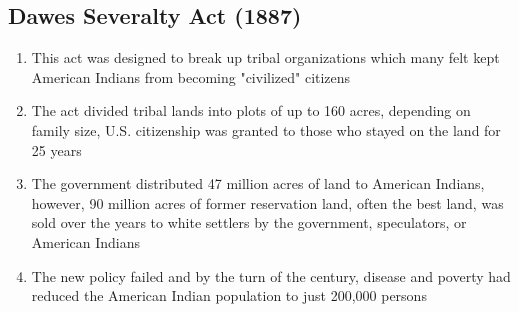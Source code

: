 \documentclass[12pt]{article} %
\begin{document}
\subsection{Dawes Severalty Act (1887)}
\begin{enumerate}
	\item This act was designed to break up tribal organizations which many felt kept American 
		Indians from becoming "civilized" citizens
	\item The act divided tribal lands into plots of up to 160 acres, depending on family size, U.S.
		citizenship was granted to those who stayed on the land for 25 years
	\item The government distributed 47 million acres of land to American Indians, however, 90 
		million acres of former reservation land, often the best land, was sold over the years to white
		settlers by the government, speculators, or American Indians
	\item The new policy failed and by the turn of the century, disease and poverty had reduced the
		American Indian population to just 200,000 persons
\end{enumerate}
\end{document}
